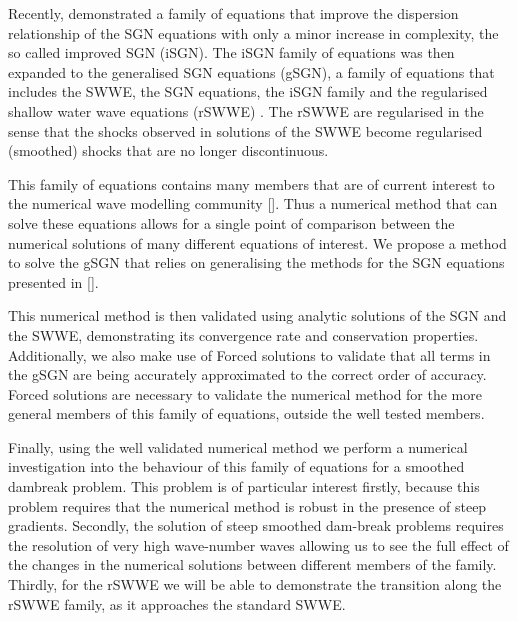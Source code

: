 \documentclass[10pt]{elsarticle}
\begin{document}
Recently, \cite{Clamond-et.al-2017-245} demonstrated a family of equations that improve the dispersion relationship of the SGN equations with only a minor increase in complexity, the so called improved SGN (iSGN). The iSGN family of equations was then expanded to the generalised SGN equations (gSGN), a family of equations that includes the SWWE, the SGN equations, the iSGN family and the regularised shallow water wave equations (rSWWE) \cite{Clamond-Dutykh-2018-237}. The rSWWE are regularised in the sense that the shocks observed in solutions of the SWWE become regularised (smoothed) shocks that are no longer discontinuous.

This family of equations contains many members that are of current interest to the numerical wave modelling community []. Thus a numerical method that can solve these equations allows for a single point of comparison between the numerical solutions of many different equations of interest. We propose a method to solve the gSGN that relies on generalising the methods for the SGN equations presented in [].

This numerical method is then validated using analytic solutions of the SGN and the SWWE, demonstrating its convergence rate and conservation properties. Additionally, we also make use of Forced solutions to validate that all terms in the gSGN are being accurately approximated to the correct order of accuracy. Forced solutions are necessary to validate the numerical method for the more general members of this family of equations, outside the well tested members.

Finally, using the well validated numerical method we perform a numerical investigation into the behaviour of this family of equations for a smoothed dambreak problem. This problem is of particular interest firstly, because this problem requires that the numerical method is robust in the presence of steep gradients. Secondly, the solution of steep smoothed dam-break problems requires the resolution of very high wave-number waves allowing us to see the full effect of the changes in the numerical solutions between different members of the family. Thirdly, for the rSWWE we will be able to demonstrate the transition along the rSWWE family, as it approaches the standard SWWE. 
\end{document}
